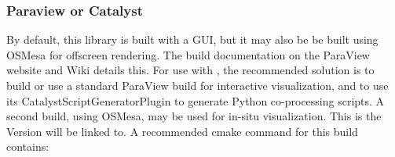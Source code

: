 \documentclass[a4paper,10pt,twoside]{csshortdoc}
\begin{document}
\subsubsection{Paraview or Catalyst\label{sec:ext:catalyst}}

By default, this library is built with a GUI, but it may also be be
built using OSMesa for offscreen rendering. The build documentation
on the ParaView website and Wiki details this. For use with \CS,
the recommended solution is to build or use a standard ParaView build
for interactive visualization, and to use its CatalystScriptGeneratorPlugin
to generate Python co-processing scripts. A second build, using OSMesa,
may be used for in-situ visualization. This is the Version \CS will be linked
to. A recommended cmake command for this build contains:

\end{document}
